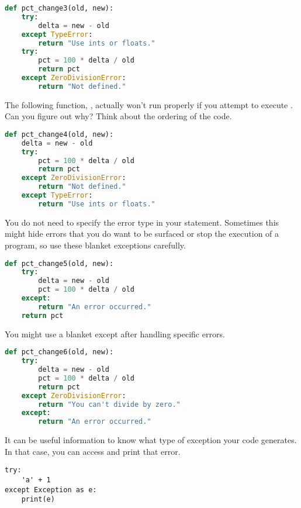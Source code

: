\smallskip
\begin{lstlisting}[language = Python]
def pct_change3(old, new):
    try:
        delta = new - old
    except TypeError:
        return "Use ints or floats."
    try:
        pct = 100 * delta / old
        return pct
    except ZeroDivisionError:
        return "Not defined."\end{lstlisting}



\smallskip

\noindent The following function, , actually won't run properly if you attempt to execute . Can you figure out why? Think about the ordering of the code. 

\begin{lstlisting}[language = Python]
def pct_change4(old, new):
    delta = new - old
    try:
        pct = 100 * delta / old
        return pct
    except ZeroDivisionError:
        return "Not defined."
    except TypeError:
        return "Use ints or floats."\end{lstlisting}
        
\smallskip
\noindent You do not need to specify the error type in your  statement. Sometimes this might hide errors that you do want to be surfaced or stop the execution of a program, so use these blanket exceptions carefully. 

\begin{lstlisting}[language = Python]
def pct_change5(old, new):
    try:
        delta = new - old
        pct = 100 * delta / old
    except:
        return "An error occurred."
    return pct\end{lstlisting}
    
\smallskip
\noindent You might use a blanket except after handling specific errors. 

\begin{lstlisting}[language = Python]
def pct_change6(old, new):
    try:
        delta = new - old
        pct = 100 * delta / old
        return pct
    except ZeroDivisionError:
        return "You can't divide by zero."
    except:
        return "An error occurred."\end{lstlisting}
        
\smallskip
\noindent It can be useful information to know what type of exception your code generates. In that case, you can access and print that error. 

\begin{lstlisting}
try:
    'a' + 1
except Exception as e:
    print(e)\end{lstlisting}
    
